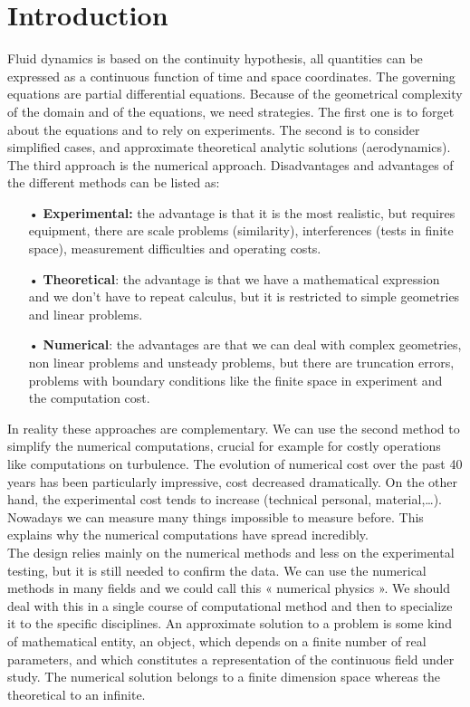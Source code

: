 
\chapter*{Introduction}

Fluid dynamics is based on the continuity hypothesis, all quantities can be expressed as a continuous function of time and space coordinates. The governing equations are partial differential equations. Because of the geometrical complexity of the domain and of the equations, we need strategies. The first one is to forget about the equations and to rely on experiments. The second is to consider simplified cases, and approximate theoretical analytic solutions (aerodynamics). The third approach is the numerical approach. Disadvantages and advantages of the different methods can be listed as: \\

\begin{itemize}
\item[•] \textbf{Experimental:} the advantage is that it is the most realistic, but requires equipment, there are scale problems (similarity), interferences (tests in finite space), measurement difficulties and operating costs.
\item[•] \textbf{Theoretical}: the advantage is that we have a mathematical expression and we don't have to repeat calculus, but it is restricted to simple geometries and linear problems. 
\item[•] \textbf{Numerical}: the advantages are that we can deal with complex geometries, non linear problems and unsteady problems, but there are truncation errors, problems with boundary conditions like the finite space in experiment and the computation cost. \\
\end{itemize}

In reality these approaches are complementary. We can use the second method to simplify the numerical computations, crucial for example for costly operations like computations on turbulence. The evolution of numerical cost over the past 40 years has been particularly impressive, cost decreased dramatically. On the other hand, the experimental cost tends to increase (technical personal, material,…). Nowadays we can measure many things impossible to measure before. This explains why the numerical computations have spread incredibly. \\

The design relies mainly on the numerical methods and less on the experimental testing, but it is still needed to confirm the data. We can use the numerical methods in many fields and we could call this « numerical physics ». We should deal with this in a single course of computational method and then to specialize it to the specific disciplines. An approximate solution to a problem is some kind of mathematical entity, an object, which depends on a finite number of real parameters, and which constitutes a representation of the continuous field under study. The numerical solution belongs to a finite dimension space whereas the theoretical to an infinite. \\

